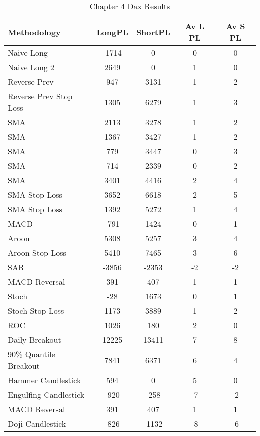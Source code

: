 \begin{table}[ht]
\centering
\caption[Chapter 4 Dax Results]{Chapter 4 Dax Results} 
\label{tab:chp6:dax_summary}
\begin{tabular}{lcccc}
  \toprule Methodology & LongPL & ShortPL & Av L PL & Av S PL \\ 
  \midrule Naive Long & -1714 & 0 & 0 & 0 \\ 
  Naive Long 2 & 2649 & 0 & 1 & 0 \\ 
  Reverse Prev & 947 & 3131 & 1 & 2 \\ 
  Reverse Prev Stop Loss & 1305 & 6279 & 1 & 3 \\ 
  SMA & 2113 & 3278 & 1 & 2 \\ 
  SMA & 1367 & 3427 & 1 & 2 \\ 
  SMA & 779 & 3447 & 0 & 3 \\ 
  SMA & 714 & 2339 & 0 & 2 \\ 
  SMA & 3401 & 4416 & 2 & 4 \\ 
  SMA Stop Loss & 3652 & 6618 & 2 & 5 \\ 
  SMA Stop Loss & 1392 & 5272 & 1 & 4 \\ 
  MACD & -791 & 1424 & 0 & 1 \\ 
  Aroon & 5308 & 5257 & 3 & 4 \\ 
  Aroon Stop Loss & 5410 & 7465 & 3 & 6 \\ 
  SAR & -3856 & -2353 & -2 & -2 \\ 
  MACD Reversal & 391 & 407 & 1 & 1 \\ 
  Stoch & -28 & 1673 & 0 & 1 \\ 
  Stoch Stop Loss & 1173 & 3889 & 1 & 2 \\ 
  ROC & 1026 & 180 & 2 & 0 \\ 
  Daily Breakout & 12225 & 13411 & 7 & 8 \\ 
  90\% Quantile Breakout & 7841 & 6371 & 6 & 4 \\ 
  Hammer Candlestick & 594 & 0 & 5 & 0 \\ 
  Engulfing Candlestick & -920 & -258 & -7 & -2 \\ 
  MACD Reversal & 391 & 407 & 1 & 1 \\ 
  Doji Candlestick & -826 & -1132 & -8 & -6 \\ 
   \bottomrule \end{tabular}
\end{table}
